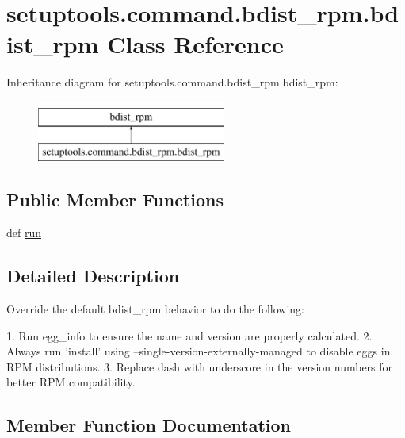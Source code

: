 \hypertarget{classsetuptools_1_1command_1_1bdist__rpm_1_1bdist__rpm}{}\section{setuptools.\+command.\+bdist\+\_\+rpm.\+bdist\+\_\+rpm Class Reference}
\label{classsetuptools_1_1command_1_1bdist__rpm_1_1bdist__rpm}
Inheritance diagram for setuptools.\+command.\+bdist\+\_\+rpm.\+bdist\+\_\+rpm\+:\begin{figure}[H]
\begin{center}
\leavevmode
\includegraphics[height=2.000000cm]{classsetuptools_1_1command_1_1bdist__rpm_1_1bdist__rpm}
\end{center}
\end{figure}
\subsection*{Public Member Functions}
\begin{DoxyCompactItemize}
\item 
def \hyperlink{classsetuptools_1_1command_1_1bdist__rpm_1_1bdist__rpm_a04f476292701dbfe009888b014dbc19b}{run}
\end{DoxyCompactItemize}


\subsection{Detailed Description}
\begin{DoxyVerb}Override the default bdist_rpm behavior to do the following:

1. Run egg_info to ensure the name and version are properly calculated.
2. Always run 'install' using --single-version-externally-managed to
   disable eggs in RPM distributions.
3. Replace dash with underscore in the version numbers for better RPM
   compatibility.
\end{DoxyVerb}
 

\subsection{Member Function Documentation}
\hypertarget{classsetuptools_1_1command_1_1bdist__rpm_1_1bdist__rpm_a04f476292701dbfe009888b014dbc19b}{}
